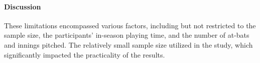 \documentclass[12pt]{article}
\begin{document}
\lipsum[4]

\paragraph{Discussion}
These limitations encompassed various factors, including but not restricted to the sample size, the participants' in-season playing time,
and the number of at-bats and innings pitched. The relatively small sample size utilized in the study, which significantly impacted the practicality of the results.

\lipsum[5]



\end{document}
